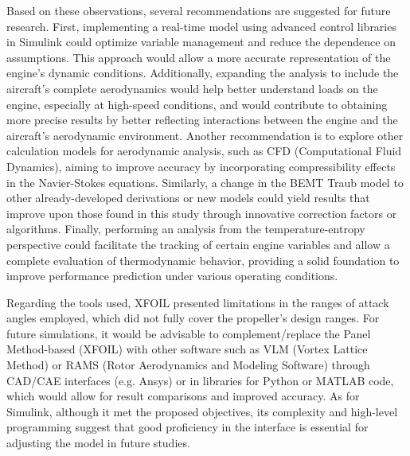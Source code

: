 \documentclass{Format}
\begin{document}
Based on these observations, several recommendations are suggested for future research. First, implementing a real-time model using advanced control libraries in Simulink could optimize variable management and reduce the dependence on assumptions. This approach would allow a more accurate representation of the engine’s dynamic conditions. Additionally, expanding the analysis to include the aircraft’s complete aerodynamics would help better understand loads on the engine, especially at high-speed conditions, and would contribute to obtaining more precise results by better reflecting interactions between the engine and the aircraft’s aerodynamic environment. Another recommendation is to explore other calculation models for aerodynamic analysis, such as CFD (Computational Fluid Dynamics), aiming to improve accuracy by incorporating compressibility effects in the Navier-Stokes equations. Similarly, a change in the BEMT Traub model to other already-developed derivations or new models could yield results that improve upon those found in this study through innovative correction factors or algorithms. Finally, performing an analysis from the temperature-entropy perspective could facilitate the tracking of certain engine variables and allow a complete evaluation of thermodynamic behavior, providing a solid foundation to improve performance prediction under various operating conditions.

Regarding the tools used, XFOIL presented limitations in the ranges of attack angles employed, which did not fully cover the propeller’s design ranges. For future simulations, it would be advisable to complement/replace the Panel Method-based (XFOIL) with other software such as VLM (Vortex Lattice Method) or RAMS (Rotor Aerodynamics and Modeling Software) through CAD/CAE interfaces (e.g. Ansys) or in libraries for Python or MATLAB code, which would allow for result comparisons and improved accuracy. As for Simulink, although it met the proposed objectives, its complexity and high-level programming suggest that good proficiency in the interface is essential for adjusting the model in future studies.



\newpage


\end{document}
